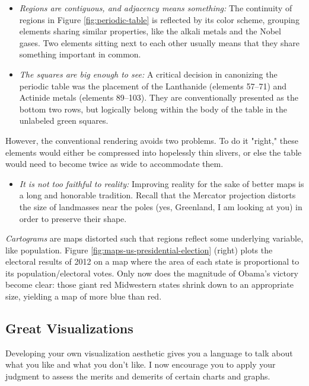 \documentclass[10pt]{article}
\begin{document}
\begin{itemize}
    \item \textit{Regions are contiguous, and adjacency means something:} The continuity of regions in Figure \ref{fig:periodic-table} is reflected by its color scheme, grouping elements sharing similar properties, like the alkali metals and the Nobel gases. Two elements sitting next to each other usually means that they share something important in common.
    \item \textit{The squares are big enough to see:} A critical decision in canonizing the periodic table was the placement of the Lanthanide (elements 57–71) and Actinide metals (elements 89–103). They are conventionally presented as the bottom two rows, but logically belong within the body of the table in the unlabeled green squares.
\end{itemize}

However, the conventional rendering avoids two problems. To do it "right," these elements would either be compressed into hopelessly thin slivers, or else the table would need to become twice as wide to accommodate them.

\begin{itemize}
    \item \textit{It is not too faithful to reality:} Improving reality for the sake of better maps is a long and honorable tradition. Recall that the Mercator projection distorts the size of landmasses near the poles (yes, Greenland, I am looking at you) in order to preserve their shape.
\end{itemize}

\textit{Cartograms} are maps distorted such that regions reflect some underlying variable, like population. Figure \ref{fig:maps-us-presidential-election} (right) plots the electoral results of 2012 on a map where the area of each state is proportional to its population/electoral votes. Only now does the magnitude of Obama's victory become clear: those giant red Midwestern states shrink down to an appropriate size, yielding a map of more blue than red.

\subsection*{Great Visualizations}
Developing your own visualization aesthetic gives you a language to talk about what you like and what you don’t like. I now encourage you to apply your judgment to assess the merits and demerits of certain charts and graphs.
\end{document}
